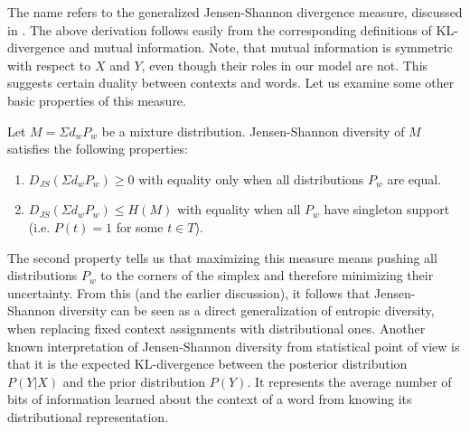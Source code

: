 The name refers to the generalized Jensen-Shannon divergence measure, 
discussed in \cite{FugledeTopsoe}. The above derivation follows easily
from the corresponding definitions of KL-divergence and mutual
information. Note, that mutual information is symmetric with respect
to $X$ and $Y$, even though their roles in our model are not. This
suggests certain duality between contexts and words. Let us examine
some other basic properties of this measure.

\bep\label{jsd-properties}
Let $M=\Sigma d_w P_w$ be a mixture distribution. Jensen-Shannon
diversity of $M$ satisfies the following properties:
 \begin{enumerate}
   \item $D_{JS}(\Sigma d_wP_w)\geq 0$ with equality only when all
     distributions $P_w$ are equal.
   \item $D_{JS}(\Sigma d_wP_w)\leq H(M)$ with equality when all
     $P_w$ have singleton support (i.e. $P(t)=1$ for some $t\in T$).
 \end{enumerate}
\eep
The second property tells us that maximizing this measure means
pushing all distributions $P_w$ to the corners of the simplex and
therefore minimizing their uncertainty.
From this (and the earlier discussion), it follows that Jensen-Shannon
diversity can be seen as a direct generalization of entropic
diversity, when replacing fixed context assignments 
with distributional ones. 
Another known interpretation of Jensen-Shannon diversity from
statistical point of view is that it is the expected KL-divergence
between the posterior distribution $P(Y|X)$ and the prior distribution
$P(Y)$. It represents the average number of bits of information
learned about the context of a word from knowing its distributional
representation.